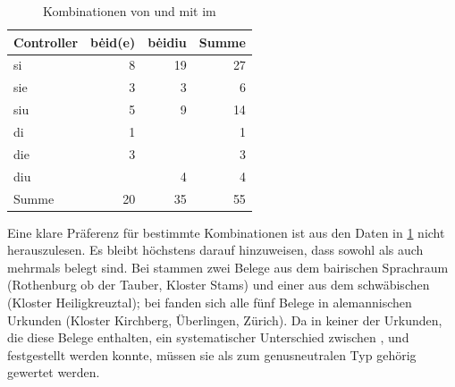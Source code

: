 \begin{table}
\centering
\caption{Kombinationen von  und  mit  im
\CAO{}}
\begin{tabular}{
	l
	r r
	r
}
\toprule
Controller
	& bėid(e)
	& bėidiu
	& Summe
	\\

\midrule

si    &  8 & 19 & 27 \\
sie   &  3 &  3 &  6 \\
siu   &  5 &  9 & 14 \\

\midrule

di    &  1 &    &  1 \\
die   &  3 &    &  3 \\
diu   &    &  4 &  4 \\

\midrule

Summe & 20 & 35 & 55 \\
\bottomrule
\end{tabular}
\label{tab:caosiebeidekombis}
\end{table}

Eine klare Präferenz für bestimmte Kombinationen ist aus den Daten in
\cref{tab:caosiebeidekombis} nicht herauszulesen. Es bleibt höchstens darauf
hinzuweisen, dass sowohl 
als auch 
mehrmals belegt sind. Bei  stammen zwei Belege aus dem
bairischen Sprachraum (Rothenburg ob der Tauber, Kloster Stams) und einer aus
dem schwäbischen (Kloster Heiligkreuztal); bei  fanden sich
alle fünf Belege in alemannischen Urkunden (Kloster Kirchberg, Überlingen,
Zürich). Da in keiner der Urkunden, die diese Belege enthalten, ein
systematischer Unterschied zwischen ,  und
 festgestellt werden konnte, müssen sie als zum genusneutralen Typ
 gehörig gewertet werden.



